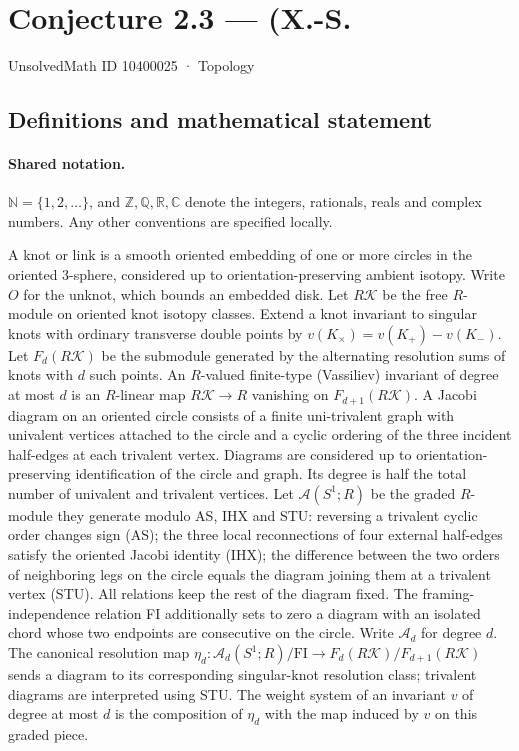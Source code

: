 \documentclass[11pt]{article}
\begin{document}
\setcounter{section}{10400024}
\section{Conjecture 2.3 — (X.-S.}\label{10400025}
{\small\sffamily UnsolvedMath ID 10400025 · Topology}
\subsection{Definitions and mathematical statement}

\paragraph{Shared notation.}$\mathbb N=\{1,2,\ldots\}$, and $\mathbb Z,\mathbb Q,\mathbb R,\mathbb C$ denote the integers, rationals, reals and complex numbers. Any other conventions are specified locally.


A knot or link is a smooth oriented embedding of one or more circles in the oriented $3$-sphere, considered up to orientation-preserving ambient isotopy. Write $O$ for the unknot, which bounds an embedded disk. Let $R\mathcal K$ be the free $R$-module on oriented knot isotopy classes. Extend a knot invariant to singular knots with ordinary transverse double points by $v(K_\times)=v(K_+)-v(K_-)$. Let $F_d(R\mathcal K)$ be the submodule generated by the alternating resolution sums of knots with $d$ such points. An $R$-valued finite-type (Vassiliev) invariant of degree at most $d$ is an $R$-linear map $R\mathcal K\to R$ vanishing on $F_{d+1}(R\mathcal K)$. A Jacobi diagram on an oriented circle consists of a finite uni-trivalent graph with univalent vertices attached to the circle and a cyclic ordering of the three incident half-edges at each trivalent vertex. Diagrams are considered up to orientation-preserving identification of the circle and graph. Its degree is half the total number of univalent and trivalent vertices. Let $\mathcal A(S^1;R)$ be the graded $R$-module they generate modulo AS, IHX and STU: reversing a trivalent cyclic order changes sign (AS); the three local reconnections of four external half-edges satisfy the oriented Jacobi identity (IHX); the difference between the two orders of neighboring legs on the circle equals the diagram joining them at a trivalent vertex (STU). All relations keep the rest of the diagram fixed. The framing-independence relation FI additionally sets to zero a diagram with an isolated chord whose two endpoints are consecutive on the circle. Write $\mathcal A_d$ for degree $d$. The canonical resolution map $\eta_d:\mathcal A_d(S^1;R)/\mathrm{FI}\to F_d(R\mathcal K)/F_{d+1}(R\mathcal K)$ sends a diagram to its corresponding singular-knot resolution class; trivalent diagrams are interpreted using STU. The weight system of an invariant $v$ of degree at most $d$ is the composition of $\eta_d$ with the map induced by $v$ on this graded piece.
\end{document}
